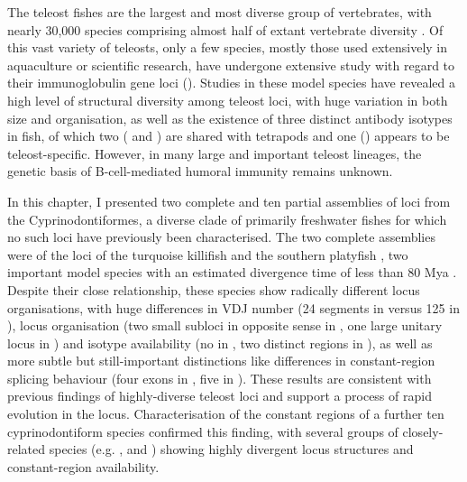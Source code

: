 The teleost fishes are the largest and most diverse group of vertebrates, with nearly 30,000 species comprising almost half of extant vertebrate diversity \parencite{ravi2018divergent}. Of this vast variety of teleosts, only a few species, mostly those used extensively in aquaculture or scientific research, have undergone extensive study with regard to their immunoglobulin gene loci (). Studies in these model species have revealed a high level of structural diversity among teleost \igh{} loci, with huge variation in both size and organisation, as well as the existence of three distinct antibody isotypes in fish, of which two ( and ) are shared with tetrapods and one () appears to be teleost-specific. However, in many large and important teleost lineages, the genetic basis of B-cell-mediated humoral immunity remains unknown.

In this chapter, I presented two complete and ten partial assemblies of \igh{} loci from the Cyprinodontiformes, a diverse clade of primarily freshwater fishes for which no such loci have previously been characterised. The two complete assemblies were of the \igh{} loci of the turquoise killifish \nfu and the southern platyfish \xma, two important model species with an estimated divergence time of less than 80 Mya \parencite{hughes2018teleostphylo}. Despite their close relationship, these species show radically different locus organisations, with huge differences in VDJ number (24 \vh segments in \Nfu versus 125 in \Xma), locus organisation (two small subloci in opposite sense in \Nfu, one large unitary locus in \Xma) and isotype availability (no  in \Nfu, two distinct  regions in \Xma), as well as more subtle but still-important distinctions like differences in constant-region splicing behaviour (four exons in \Nfu {}, five in \Xma). These results are consistent with previous findings of highly-diverse teleost loci and support a process of rapid evolution in the \igh{} locus. Characterisation of the constant regions of a further ten cyprinodontiform species confirmed this finding, with several groups of closely-related species (e.g. \nfu,  and ) showing highly divergent locus structures and constant-region availability.

